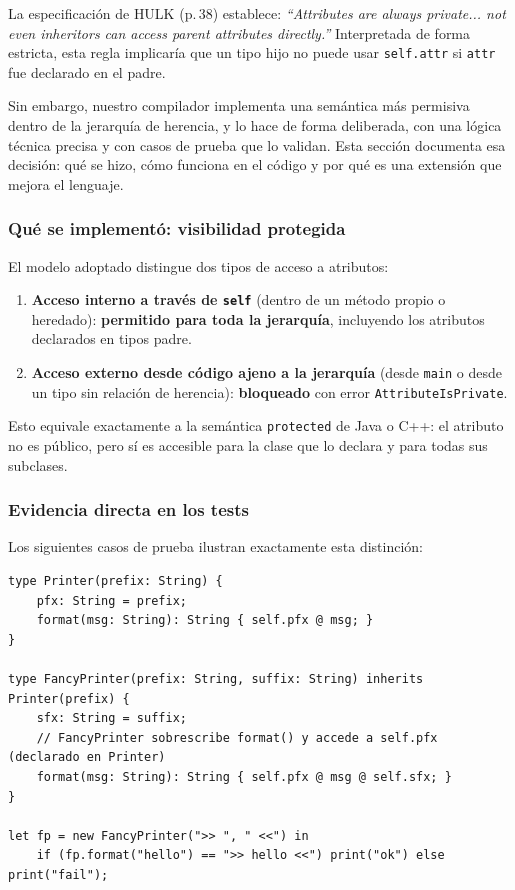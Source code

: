 \documentclass[12pt,letterpaper]{article}
\newcommand{\hulk}{\textsc{HULK}}
\newcommand{\src}[1]{\texttt{#1}}
\begin{document}
La especificación de \hulk{} (p.\,38) establece: \textit{``Attributes are always private... not even inheritors can access parent attributes directly.''}  Interpretada de forma estricta, esta regla implicaría que un tipo hijo no puede usar \src{self.attr} si \src{attr} fue declarado en el padre.

Sin embargo, nuestro compilador implementa una semántica más permisiva dentro de la jerarquía de herencia, y lo hace de forma deliberada, con una lógica técnica precisa y con casos de prueba que lo validan. Esta sección documenta esa decisión: qué se hizo, cómo funciona en el código y por qué es una extensión que mejora el lenguaje.

\subsubsection{Qué se implementó: visibilidad protegida}

El modelo adoptado distingue dos tipos de acceso a atributos:

\begin{enumerate}[label=\arabic*.]
    \item \textbf{Acceso interno a través de \src{self}} (dentro de un método propio o heredado): \textbf{permitido para toda la jerarquía}, incluyendo los atributos declarados en tipos padre.
    \item \textbf{Acceso externo desde código ajeno a la jerarquía} (desde \src{main} o desde un tipo sin relación de herencia): \textbf{bloqueado} con error \src{AttributeIsPrivate}.
\end{enumerate}

Esto equivale exactamente a la semántica \src{protected} de Java o C++: el atributo no es público, pero sí es accesible para la clase que lo declara y para todas sus subclases.

\subsubsection{Evidencia directa en los tests}

Los siguientes casos de prueba ilustran exactamente esta distinción:

\begin{lstlisting}[language=HULK,caption={method\_override.hulk: FancyPrinter accede a self.pfx declarado en Printer}]
type Printer(prefix: String) {
    pfx: String = prefix;
    format(msg: String): String { self.pfx @ msg; }
}

type FancyPrinter(prefix: String, suffix: String) inherits Printer(prefix) {
    sfx: String = suffix;
    // FancyPrinter sobrescribe format() y accede a self.pfx (declarado en Printer)
    format(msg: String): String { self.pfx @ msg @ self.sfx; }
}

let fp = new FancyPrinter(">> ", " <<") in
    if (fp.format("hello") == ">> hello <<") print("ok") else print("fail");
\end{lstlisting}
\end{document}
